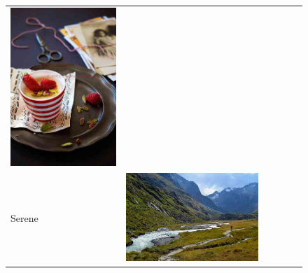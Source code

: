 \begin{figure}
\begin{tabular}{m{.01\linewidth} m{.16\linewidth} m{.16\linewidth} m{.16\linewidth} m{.16\linewidth} m{.16\linewidth}}
    \includegraphics[width=\linewidth]{../style/figures/flickr_on_flickr/pred_style_Romantic/4.jpg} \\
    \begin{turn}{90}{Serene}\end{turn} &
    \includegraphics[width=\linewidth]{../style/figures/flickr_on_flickr/pred_style_Serene/0.jpg} &

\end{tabular}
\end{figure}
